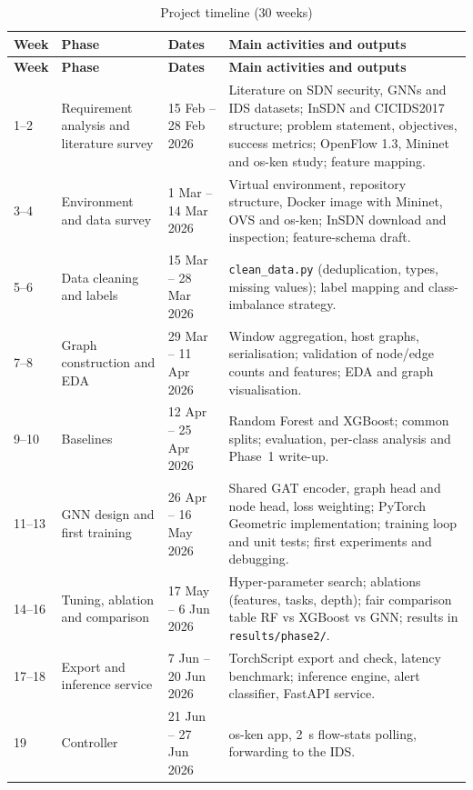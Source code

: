 \begin{appendices}
\begin{longtable}{|p{1.0cm}|p{3.4cm}|p{3.0cm}|p{7.2cm}|}
\caption{Project timeline (30 weeks)}\label{tab:timeline}\\
\hline
\textbf{Week} & \textbf{Phase} & \textbf{Dates} & \textbf{Main activities and outputs} \\ \hline
\endfirsthead
\hline \textbf{Week} & \textbf{Phase} & \textbf{Dates} & \textbf{Main activities and outputs} \\ \hline
\endhead
1--2 & Requirement analysis and literature survey & 15 Feb -- 28 Feb 2026 & Literature on SDN security, GNNs and IDS datasets; InSDN and CICIDS2017 structure; problem statement, objectives, success metrics; OpenFlow 1.3, Mininet and os-ken study; feature mapping. \\ \hline
3--4 & Environment and data survey & 1 Mar -- 14 Mar 2026 & Virtual environment, repository structure, Docker image with Mininet, OVS and os-ken; InSDN download and inspection; feature-schema draft. \\ \hline
5--6 & Data cleaning and labels & 15 Mar -- 28 Mar 2026 & \texttt{clean\_data.py} (deduplication, types, missing values); label mapping and class-imbalance strategy. \\ \hline
7--8 & Graph construction and EDA & 29 Mar -- 11 Apr 2026 & Window aggregation, host graphs, serialisation; validation of node/edge counts and features; EDA and graph visualisation. \\ \hline
9--10 & Baselines & 12 Apr -- 25 Apr 2026 & Random Forest and XGBoost; common splits; evaluation, per-class analysis and Phase~1 write-up. \\ \hline
11--13 & GNN design and first training & 26 Apr -- 16 May 2026 & Shared GAT encoder, graph head and node head, loss weighting; PyTorch Geometric implementation; training loop and unit tests; first experiments and debugging. \\ \hline
14--16 & Tuning, ablation and comparison & 17 May -- 6 Jun 2026 & Hyper-parameter search; ablations (features, tasks, depth); fair comparison table RF vs XGBoost vs GNN; results in \texttt{results/phase2/}. \\ \hline
17--18 & Export and inference service & 7 Jun -- 20 Jun 2026 & TorchScript export and check, latency benchmark; inference engine, alert classifier, FastAPI service. \\ \hline
19 & Controller & 21 Jun -- 27 Jun 2026 & os-ken app, 2~s flow-stats polling, forwarding to the IDS. \\ \hline

\end{longtable}
\end{appendices}
